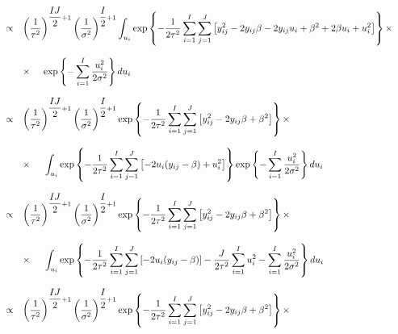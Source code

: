 \documentclass{article}
\begin{document}
\begin{equation*}
\begin{array}{lcl ll }

& \propto & \left(\dfrac{1}{\tau^2}\right)^{\dfrac{IJ}{2}+1} \left(\dfrac{1}{\sigma^2}\right)^{\dfrac{I}{2}+1} \displaystyle\int_{u_i} \mbox{exp}\left\{ - \dfrac{1}{2\tau^2} \displaystyle\sum_{i=1}^{I}\sum_{j=1}^{J}\left[ y_{ij}^2 - 2y_{ij}\beta -2y_{ij}u_i + \beta^2 + 2\beta u_i + u_i^2 \right] \right\} \times \\ \\

& & \times \hspace{0.5cm} \mbox{exp}\left\{ - \displaystyle\sum_{i=1}^{I} \dfrac{u_i^2}{2\sigma^2} \right\} du_i\\\\


& \propto & \left(\dfrac{1}{\tau^2}\right)^{\dfrac{IJ}{2}+1} \left(\dfrac{1}{\sigma^2}\right)^{\dfrac{I}{2}+1}  \mbox{exp}\left\{ - \dfrac{1}{2\tau^2} \displaystyle\sum_{i=1}^{I}\sum_{j=1}^{J}\left[ y_{ij}^2 - 2y_{ij}\beta + \beta^2 \right] \right\} \times \\ \\

& & \times \hspace{0.5cm} \displaystyle\int_{u_i} \mbox{exp}\left\{ - \dfrac{1}{2\tau^2} \displaystyle\sum_{i=1}^{I}\sum_{j=1}^{J}\left[ -2u_i (y_{ij} - \beta) + u_i^2 \right] \right\} \mbox{exp}\left\{ - \displaystyle\sum_{i=1}^{I} \dfrac{u_i^2}{2\sigma^2} \right\} du_i\\\\


& \propto & \left(\dfrac{1}{\tau^2}\right)^{\dfrac{IJ}{2}+1} \left(\dfrac{1}{\sigma^2}\right)^{\dfrac{I}{2}+1}  \mbox{exp}\left\{ - \dfrac{1}{2\tau^2} \displaystyle\sum_{i=1}^{I}\sum_{j=1}^{J}\left[ y_{ij}^2 - 2y_{ij}\beta + \beta^2 \right] \right\} \times \\ \\

& & \times \hspace{0.5cm} \displaystyle\int_{u_i} \mbox{exp}\left\{ - \dfrac{1}{2\tau^2} \displaystyle\sum_{i=1}^{I}\sum_{j=1}^{J}\left[ -2u_i (y_{ij} - \beta)\right] - \dfrac{J}{2\tau^2} \displaystyle\sum_{i=1}^{I}u_i^2  - \displaystyle\sum_{i=1}^{I} \dfrac{u_i^2}{2\sigma^2} \right\} du_i\\\\

& \propto & \left(\dfrac{1}{\tau^2}\right)^{\dfrac{IJ}{2}+1} \left(\dfrac{1}{\sigma^2}\right)^{\dfrac{I}{2}+1}  \mbox{exp}\left\{ - \dfrac{1}{2\tau^2} \displaystyle\sum_{i=1}^{I}\sum_{j=1}^{J}\left[ y_{ij}^2 - 2y_{ij}\beta + \beta^2 \right] \right\} \times \\ \\


\end{array}
\end{equation*}
\end{document}

